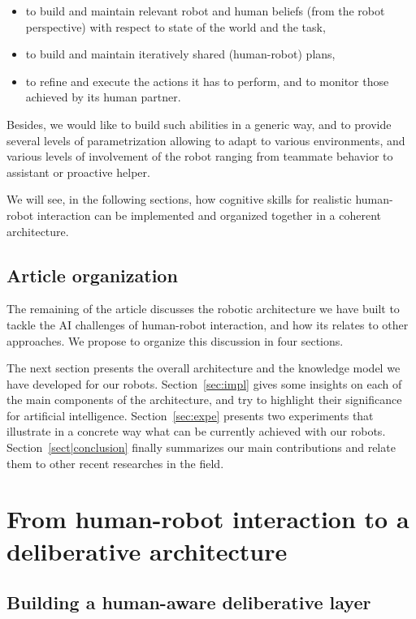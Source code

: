 \documentclass[preprint,3p,times]{elsarticle}
\begin{document}
\begin{itemize}
\item to build and maintain relevant robot and human beliefs
  (from the robot perspective) with respect to state of the world and the task,
\item to build and maintain iteratively shared (human-robot) plans, 
\item to refine and execute the actions it has to perform, and to monitor 
those achieved by its human partner.
\end{itemize}

Besides, we would like to build such abilities in a generic way, and
to provide several levels of parametrization allowing to adapt to
various environments, and various levels of involvement of the robot
ranging from teammate behavior to assistant or proactive helper.

We will see, in the following sections, how cognitive skills for realistic
human-robot interaction can be implemented and organized together in a coherent
architecture.

\subsection{Article organization}

The remaining of the article discusses the robotic architecture we have built to
tackle the AI challenges of human-robot interaction, and how its relates to
other approaches. We propose to organize this discussion in four sections.

The next section presents the overall architecture and the knowledge model we
have developed for our robots. Section~\ref{sec:impl} gives some insights on
each of the main components of the architecture, and try to highlight their
significance for artificial intelligence. Section~\ref{sec:expe} presents two
experiments that illustrate in a concrete way what can be currently achieved
with our robots.  Section~\ref{sect|conclusion} finally summarizes our main
contributions and relate them to other recent researches in the field.

\section{From human-robot interaction to a deliberative architecture}

\subsection{Building a human-aware deliberative layer}
\end{document}
